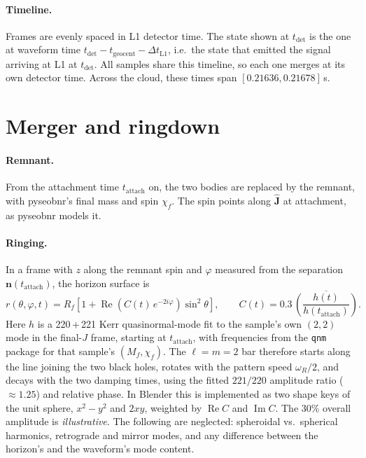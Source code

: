 \documentclass[11pt,a4paper]{article}
\newcommand{\code}[1]{\texttt{#1}}
\newcommand{\vect}[1]{\boldsymbol{#1}}
\begin{document}
\paragraph{Timeline.} Frames are evenly spaced in L1 detector time. The state shown at
$t_\mathrm{det}$ is the one at waveform time
$t_\mathrm{det} - t_\mathrm{geocent} - \Delta t_\mathrm{L1}$, i.e.\ the state that emitted
the signal arriving at L1 at $t_\mathrm{det}$. All samples share this timeline, so each one
merges at its own detector time. Across the cloud, these times span
$[0.21636, 0.21678]$\,s.

\section{Merger and ringdown}\label{sec:ringdown}

\paragraph{Remnant.} From the attachment time $t_\mathrm{attach}$ on, the two bodies are
replaced by the remnant, with pyseobnr's final mass and spin $\chi_f$. The spin points
along $\hat{\vect{J}}$ at attachment, as pyseobnr models it.

\paragraph{Ringing.} In a frame with $z$ along the remnant spin and $\varphi$ measured
from the separation $\vect{n}(t_\mathrm{attach})$, the horizon surface is
\begin{equation}
  r(\theta,\varphi,t) = R_f\left[1 + \operatorname{Re}\!\left(C(t)\,e^{-2i\varphi}\right)
  \sin^2\theta\right], \qquad
  C(t) = 0.3\,\overline{\left(\frac{h(t)}{h(t_\mathrm{attach})}\right)} .
\end{equation}
Here $h$ is a 220\,+\,221 Kerr quasinormal-mode fit to the sample's own $(2,2)$ mode in
the final-$J$ frame, starting at $t_\mathrm{attach}$, with frequencies from the \code{qnm}
package for that sample's $(M_f,\chi_f)$. The $\ell=m=2$ bar therefore starts along the
line joining the two black holes, rotates with the pattern speed $\omega_R/2$, and decays
with the two damping times, using the fitted $221/220$ amplitude ratio ($\approx1.25$) and
relative phase. In Blender this is implemented as two shape keys of the unit sphere,
$x^2-y^2$ and $2xy$, weighted by $\operatorname{Re}C$ and $\operatorname{Im}C$.
The 30\% overall amplitude is \emph{illustrative}. The following are neglected:
spheroidal vs.\ spherical harmonics, retrograde and mirror modes, and any difference
between the horizon's and the waveform's mode content.
\end{document}
